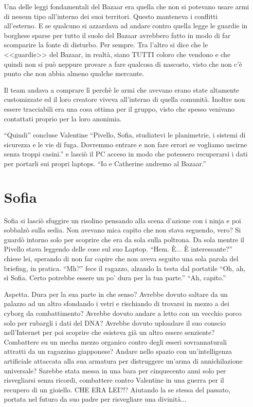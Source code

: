    Una delle leggi fondamentali del Bazaar era quella che non si potevano usare armi di nessun tipo all'interno dei
    suoi territori. Questo manteneva i conflitti all'esterno. E se qualcuno si azzardava ad andare contro quella legge
    le guardie in borghese sparse per tutto il suolo del Bazaar avrebbero fatto in modo di far scomparire la fonte di
    disturbo. Per sempre. Tra l'altro si dice che le <<guardie>> del Bazaar, in realtà, siano TUTTI coloro che vendono e
    che quindi non si può neppure provare a fare qualcosa di nascosto, visto che non c'è punto che non abbia almeno
    qualche mercante.

    Il team andava a comprare lì perchè le armi che avevano erano state altamente customizzate ed il loro creatore
    viveva all'interno di quella comunità. Inoltre non essere tracciabili era una cosa ottima per il gruppo, visto che
    spesso venivano contattati proprio per la loro anonimia.

    ``Quindi'' concluse Valentine ``Pivello, Sofia, studiatevi le planimetrie, i sistemi di sicurezza e le vie di fuga.
    Dovremmo entrare e non fare errori se vogliamo uscirne senza troppi casini.'' e lasciò il PC acceso in modo che
    potessero recuperarsi i dati per portarli sui propri laptops. ``Io e Catherine andremo al Bazaar.''

  \section*{Sofia}
    
    Sofia si lasciò sfuggire un risolino pensando alla scena d'azione con i ninja e poi sobbalzò sulla sedia. Non
    avevano mica capito che non stava seguendo, vero? Si guardò intorno solo per scoprire che era da sola sulla
    poltrona. Da sola mentre il Pivello stava leggendo delle cose sul suo Laptop. ``Hem. È... È interessante?'' chiese
    lei, sperando di non far capire che non aveva seguito una sola parola del briefing, in pratica. ``Mh?'' fece il
    ragazzo, alzando la testa dal portatile ``Oh, ah, sì Sofia. Certo potrebbe essere un po' dura per la tua parte.''
    ``Ah, capito.''

    Aspetta. Dura per la sua parte in che senso? Avrebbe dovuto saltare da un palazzo ad un altro sfondando i vetri e
    rischiando di trovarsi in mezzo a dei cyborg da combattimento? Avrebbe dovuto andare a letto con un vecchio porco
    solo per rubargli i dati del DNA? Avrebbe dovuto uploadare il suo conscio nell'Internet per poi scoprire che
    esisteva già un altro essere senziente? Combattere su un mecha mezzo organico contro degli esseri sovrannaturali
    attratti da un ragazzino giapponese? Andare nello spazio con un'intelligenza artificiale attaccata alla sua armatura
    per distruggere un'arma di annichilazione universale? Sarebbe stata messa in una bara per cinquecento anni solo per
    risvegliarsi senza ricordi, combattere contro Valentine in una guerra per il recupero di un gioiello. CHE ERA LEI?!?
    Aiutando la se stessa del passato, portata nel futuro da suo padre per risvegliare una divinità...

